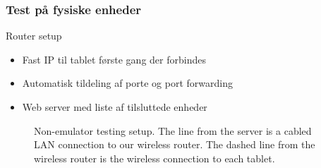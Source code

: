 \begin{frame}
    \frametitle{Test på fysiske enheder}
    Router setup
    \begin{itemize}
        \item Fast IP til tablet første gang der forbindes
        \item Automatisk tildeling af porte og port forwarding
        \item Web server med liste af tilsluttede enheder
    \end{itemize}
    \begin{figure}%
        \centering
        \caption[Some short text]{Non-emulator testing setup. The line from the server is a cabled LAN connection to our wireless router. The dashed line from the wireless router is the wireless connection to each tablet.}%
        \label{fig:wireless_router}%
    \end{figure}
\end{frame}

